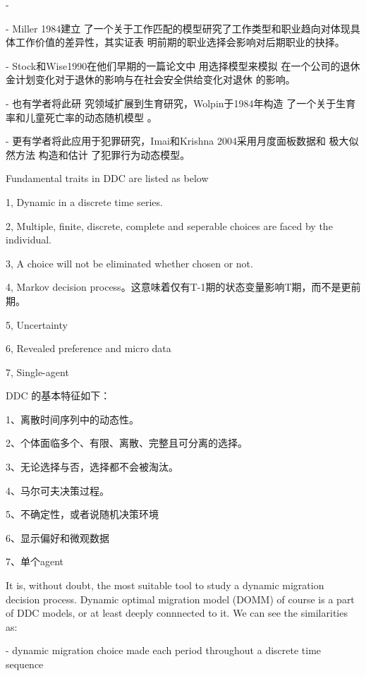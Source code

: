 \documentclass[a4paper,12pt,oneside]{book} %
\begin{document}
- \cite{keaneEmpiricalApplicationsDiscrete2009}

- Miller 1984建立 了一个关于工作匹配的模型研究了工作类型和职业趋向对体现具体工作价值的差异性，其实证表 明前期的职业选择会影响对后期职业的抉择。

- Stock和Wise1990在他们早期的一篇论文中 用选择模型来模拟  在一个公司的退休金计划变化对于退休的影响与在社会安全供给变化对退休 的影响。

- 也有学者将此研 究领域扩展到生育研究，Wolpin于1984年构造 了一个关于生育率和儿童死亡率的动态随机模型 。

- 更有学者将此应用于犯罪研究，Imai和Krishna 2004采用月度面板数据和  极大似然方法 构造和估计 了犯罪行为动态模型。









Fundamental traits in DDC are listed as below 

1, Dynamic in a discrete time series.

2, Multiple, finite, discrete, complete and seperable choices are faced by the individual.

3, A choice will not be eliminated whether chosen or not.

4, Markov decision process。这意味着仅有T-1期的状态变量影响T期，而不是更前期。

5, Uncertainty

6, Revealed preference and micro data

7, Single-agent


DDC 的基本特征如下：

1、离散时间序列中的动态性。

2、个体面临多个、有限、离散、完整且可分离的选择。

3、无论选择与否，选择都不会被淘汰。

4、马尔可夫决策过程。

5、不确定性，或者说随机决策环境

6、显示偏好和微观数据

7、单个agent





It is, without doubt, the most suitable tool to study a dynamic migration decision process. Dynamic optimal migration model (DOMM) of course is a part of DDC models, or at least deeply connnected to it. We can see the similarities as:

- dynamic migration choice made each period throughout a discrete time sequence
\end{document}
